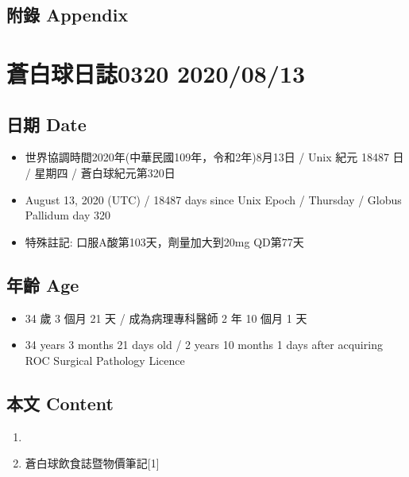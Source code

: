 \documentclass[a5paper, 11pt
]{book}
\providecommand{\tightlist}{%
  \setlength{\itemsep}{0pt}\setlength{\parskip}{0pt}}
\begin{document}
\hypertarget{ux9644ux9304-appendix-72}{%
\subsection{附錄 Appendix}\label{ux9644ux9304-appendix-72}}

\hypertarget{ux84bcux767dux7403ux65e5ux8a8c0320-20200813}{%
\section{蒼白球日誌0320
2020/08/13}\label{ux84bcux767dux7403ux65e5ux8a8c0320-20200813}}

\hypertarget{ux65e5ux671f-date-73}{%
\subsection{日期 Date}\label{ux65e5ux671f-date-73}}

\begin{itemize}
\tightlist
\item
  世界協調時間2020年(中華民國109年，令和2年)8月13日 / Unix 紀元 18487 日
  / 星期四 / 蒼白球紀元第320日
\item
  August 13, 2020 (UTC) / 18487 days since Unix Epoch / Thursday /
  Globus Pallidum day 320
\item
  特殊註記: 口服A酸第103天，劑量加大到20mg QD第77天
\end{itemize}

\hypertarget{ux5e74ux9f61-age-73}{%
\subsection{年齡 Age}\label{ux5e74ux9f61-age-73}}

\begin{itemize}
\tightlist
\item
  34 歲 3 個月 21 天 / 成為病理專科醫師 2 年 10 個月 1 天
\item
  34 years 3 months 21 days old / 2 years 10 months 1 days after
  acquiring ROC Surgical Pathology Licence
\end{itemize}

\hypertarget{ux672cux6587-content-73}{%
\subsection{本文 Content}\label{ux672cux6587-content-73}}

\begin{enumerate}
\def\labelenumi{\arabic{enumi}.}
\tightlist
\item
\item
  蒼白球飲食誌暨物價筆記{[}1{]}
\end{enumerate}
\end{document}
